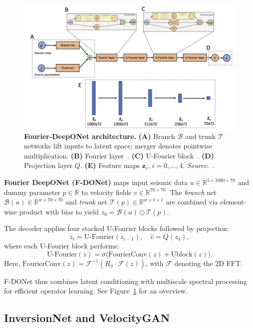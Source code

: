 \documentclass{article}
\begin{document}
\begin{figure}
    \centering
    \includegraphics[width=0.6\linewidth]{figures/FDONet.png}
    \caption{\textbf{Fourier-DeepONet architecture.} 
    \textbf{(A)} Branch $\mathcal{B}$ and trunk $\mathcal{T}$ networks lift inputs to latent space; merger denotes pointwise multiplication. 
    \textbf{(B)} Fourier layer~\cite{li2020fourier}. 
    \textbf{(C)} U-Fourier block~\cite{wen2022u}. 
    \textbf{(D)} Projection layer $Q$. 
    \textbf{(E)} Feature maps $\mathbf{z}_i$, $i=0,\dots,4$. \emph{Source}:~\cite{fdonet}.}
    \label{fig:fdonet}
\end{figure}

\textbf{Fourier DeepONet (F-DONet)} maps input seismic data \(u\in\mathbb{R}^{5\times1000\times70}\) and dummy parameter \(p\in\mathbb{R}\) to velocity fields \(v\in\mathbb{R}^{70\times70}\). The \emph{branch} net \(\mathcal{B}(u)\in \mathbb{R}^{w\times70\times70}\) and \emph{trunk} net \(\mathcal{T}(p)\in \mathbb{R}^{w\times1\times1}\) are combined via element-wise product with bias to yield \(z_0 = \mathcal{B}(u)\odot \mathcal{T}(p)\).

The decoder applies four stacked U-Fourier blocks followed by projection:
\[
z_i = \text{U-Fourier}(z_{i-1}),\quad \hat{v} = Q(z_4),
\]
where each U-Fourier block performs:
\[
\text{U-Fourier}(z) = \sigma\bigl(\text{FourierConv}(z) + \text{Ublock}(z)\bigr).
\]
Here, \(\text{FourierConv}(z) = \mathcal{F}^{-1}(R_\phi \cdot \mathcal{F}(z))\), with \(\mathcal{F}\) denoting the 2D FFT. 

F-DONet thus combines latent conditioning with multiscale spectral processing for efficient operator learning. See Figure~\ref{fig:fdonet} for an overview.


\subsection{InversionNet and VelocityGAN}
\end{document}

